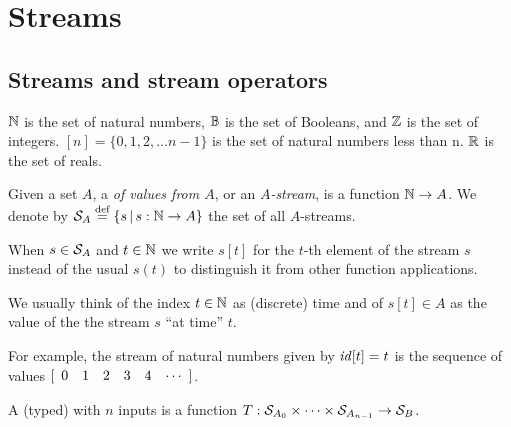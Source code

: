 \section{Streams}\label{sec:streams}

\subsection{Streams and stream operators}\label{sec:notation}

$\mathbb{N}$ is the set of natural numbers, $\mathbb{B}$ is the set of Booleans, and $\mathbb{Z}$ is the set of integers.
$[n] = \{ 0, 1, 2, \ldots n-1 \}$ is the set of natural numbers less
than n. $\mathbb{R}$ is the set of reals.

\begin{definition}[stream]
Given a set $A$, a  \emph{of values from $A$}, or an \emph{$A$-stream}, is a function $\mathbb{N} \rightarrow A$.
We denote by $\mathcal{S}_{A} \stackrel{\textrm{\scriptsize def}}{=} \{ s \,|\, s : \mathbb{N} \to A \}$ the set of all $A$-streams.
\end{definition}

When $s\in\mathcal{S}_{A}$ and $t\in\mathbb{N}$ we
write $s[t]$ for the $t$-th element of the stream $s$ instead of the usual $s(t)$
to distinguish it from other function applications.

We usually think of the index $t\in\mathbb{N}$ as (discrete) time and of $s[t]\in A$
as the value of the the stream $s$ ``at time'' $t$.

For example, the stream of natural numbers given by $\mathit{id}[t] = t$ is the sequence of values
$\sv{0 1 2 3 4}$.

\begin{comment}
\begin{definition}
A \defined{finite stream} with $n$ values from $A$ is a function $[n] \to A$.
\end{definition}

A prefix of a stream is a finite stream.  For example, the prefix of $\id$ containing
the first 5 values is the finite stream
$[\begin{array}{ccccc} 0 & 1 & 2 & 3 & 4 \end{array}]$.
\end{comment}

\begin{definition}
A (typed)  with $n$ inputs is a function $T:\mathcal{S}_{A_0}\times\cdots\times\mathcal{S}_{A_{n-1}}\to\mathcal{S}_{B}$.
\end{definition}

